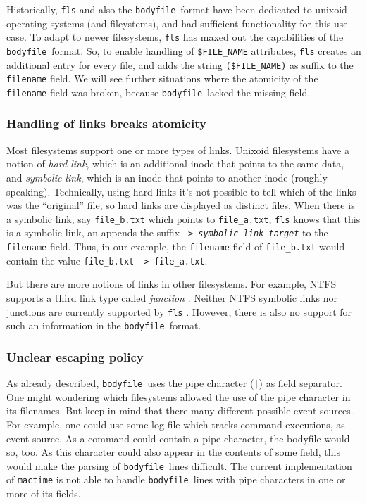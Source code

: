 \documentclass[twocolumn]{article}
\newcommand{\bodyfile}{\texttt{bodyfile}}
\begin{document}
Historically, \texttt{fls} and also the \bodyfile\ format have been dedicated to unixoid operating systems (and fileystems), and had sufficient functionality for this use case. To adapt to newer filesystems, \texttt{fls} has maxed out the capabilities of the \bodyfile\ format. So, to enable handling of \texttt{\$FILE\_NAME} attributes, \texttt{fls} creates an additional entry for every file, and adds the string \lstinline[style=inline]!($FILE_NAME)! as suffix to the \texttt{filename} field. We will see further situations where the atomicity of the \texttt{filename} field was broken, because \bodyfile\ lacked the missing field.

\subsubsection{Handling of links breaks atomicity}

Most filesystems support one or more types of links. Unixoid filesystems have a notion of \emph{hard link}, which is an additional inode that points to the same data, and \emph{symbolic link}, which is an inode that points to another inode (roughly speaking). Technically, using hard links it's not possible to tell which of the links was the \enquote{original} file, so hard links are displayed as distinct files. When there is a symbolic link, say \lstinline[style=inline]!file_b.txt! which points to \lstinline[style=inline]!file_a.txt!, \texttt{fls} knows that this is a symbolic link, an appends the suffix \texttt{\hbox{->} \emph{symbolic\_link\_target}} to the \texttt{filename} field. Thus, in our example, the \texttt{filename} field of \lstinline[style=inline]!file_b.txt! would contain the value \lstinline[style=inline]!file_b.txt -> file_a.txt!.

But there are more notions of links in other filesystems. For example, NTFS supports a third link type called \emph{junction} \citep{HardLinksAndJunctions}. Neither NTFS symbolic links nor junctions are currently supported by \texttt{fls} \citep{sleuthit-2645}. However, there is also no support for such an information in the \bodyfile\ format.

\subsubsection{Unclear escaping policy}

As already described, \bodyfile\ uses the pipe character (\texttt{|}) as field separator. One might wondering which filesystems allowed the use of the pipe character in its filenames. But keep in mind that there many different possible event sources. For example, one could use some log file which tracks command executions, as event source. As a command could contain a pipe character, the bodyfile would so, too. As this character could also appear in the contents of some field, this would make the parsing of \bodyfile\ lines difficult. The current implementation of \texttt{mactime} is not able to handle \bodyfile\ lines with pipe characters in one or more of its fields.
\end{document}
